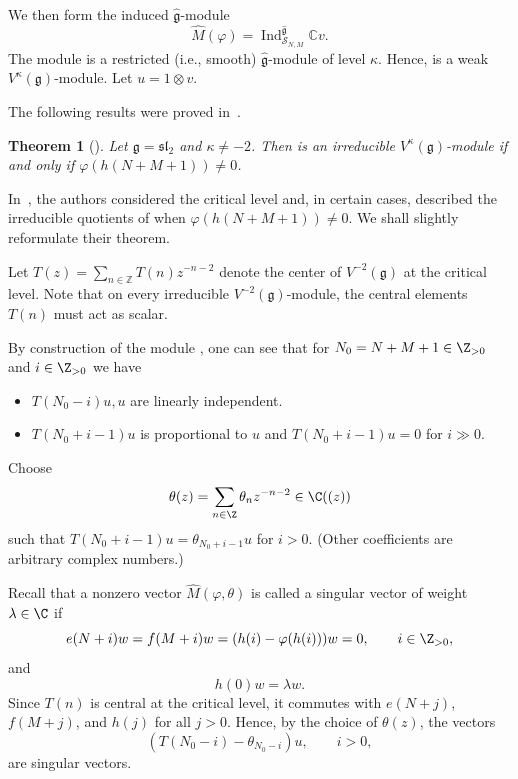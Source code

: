 \documentclass[10pt,a4paper]{amsart}
\numberwithin{equation}{section}
\newtheorem{Theorem}{Theorem}[section]
\theoremstyle{definition}
\newcommand{\1}{\textbf{1}}
\begin{document}
We then form the induced $\widehat{\mathfrak{g}}$-module
\[
 \widehat{M}(\varphi) = \operatorname{Ind}_{\mathcal{S}_{N,M}}^{\widehat{\mathfrak{g}}} \mathbb{C}v.
\]
The module  is a restricted (i.e., smooth) $\widehat{\mathfrak{g}}$-module of level $\kappa$.
Hence,  is a weak $V^{\kappa}(\mathfrak{g})$-module.
Let $u = 1 \otimes v$.

The following results were proved in~\cite[Theorem~1.1]{FGXZ}.

\begin{Theorem}[\cite{FGXZ}]\label{fgxz}
Let $\mathfrak{g} = \mathfrak{sl}_{2}$ and $\kappa \ne -2$.
Then  is an irreducible $V^{\kappa}(\mathfrak{g})$-module
if and only if $\varphi(h(N + M + 1)) \ne 0$.
\end{Theorem}

In~\cite[Theorem~1.2]{FGXZ}, the authors considered the critical level and, in certain cases,
described the irreducible quotients of  when $\varphi(h(N+M+1)) \ne 0$. We shall slightly reformulate their theorem.

Let
$
 T(z) = \sum_{n \in \mathbb{Z}} T(n) z^{-n-2}
$
denote the center of $V^{-2}(\mathfrak{g})$ at the critical level. Note that
on every irreducible $V^{-2}(\mathfrak{g})$-module, the central elements $T(n)$ must act as scalar.

By construction of the module , one can see that for $N_0 = N+M+1 \in {\Z}_{>0}$ and $i\in {\Z}_{> 0}$ we have
\begin{itemize}\itemsep=0pt
\item $T(N_0-i)u, u$ are linearly independent.
\item $T(N_0+ i-1)u$ is proportional to $u$ and $T(N_0+ i-1)u =0$ for $i \gg 0$.
 \end{itemize}
 Choose
\[ \theta(z) = \sum_{n\in {\Z}} \theta_n z^{-n-2} \in {\C} ((z)) \]
 such that $T(N_0+ i-1)u = \theta_{N_0+i-1} u$ for $i > 0$.
 (Other coefficients are arbitrary complex numbers.)

 Recall that a nonzero vector $\widehat{M}(\varphi, \theta)$ is called a singular vector of weight $\lambda\in\C$ if
\[
e(N+i)w=f(M+i)w=(h(i)-\varphi(h(i)))w=0, \qquad i\in\Z_{>0},
\]
and
\[
h(0)w=\lambda w.
\]
Since $T(n)$ is central at the critical level, it commutes with $e(N+j)$, $f(M+j)$, and $h(j)$ for all $j>0$. Hence, by the choice of $\theta(z)$, the vectors
\begin{equation}\label{singul}
(T(N_0-i)-\theta_{N_0-i})u, \qquad i>0,
\end{equation}
are singular vectors.
\end{document}
